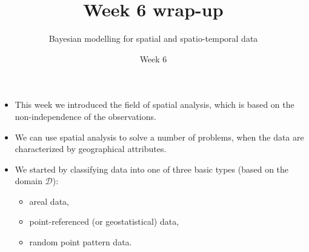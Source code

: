 \documentclass[12pt]{beamer}
\title{Week 6 wrap-up}
\subtitle{}
\author{Bayesian modelling for spatial and spatio-temporal data}
\institute{MSc in Epidemiology}
\date{Week 6}
\begin{document}
\begin{frame}[t]
  \titlepage
\end{frame}

\begin{frame}
\begin{itemize} \setlength\itemsep{\fill}
\item This week we introduced the field of spatial analysis, which is based on the non-independence of the observations.
\item We can use spatial analysis to solve a number of problems, when the data are characterized by geographical attributes.
\item We started by classifying data into one of three basic types (based on the domain $\mathcal{D}$): 
\begin{itemize}
\item areal data, 
\item point-referenced (or geostatistical) data, 
\item random point pattern data.
\end{itemize}
\end{itemize}
\end{frame}
\end{document}
